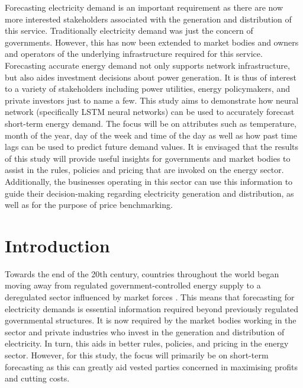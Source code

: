 \documentclass[mstat,12pt]{unswthesis}
\begin{document}
Forecasting electricity demand is an important requirement as there are
now more interested stakeholders associated with the generation and
distribution of this service. Traditionally electricity demand was just
the concern of governments. However, this has now been extended to
market bodies and owners and operators of the underlying infrastructure
required for this service. Forecasting accurate energy demand not only
supports network infrastructure, but also aides investment decisions
about power generation. It is thus of interest to a variety of
stakeholders including power utilities, energy policymakers, and private
investors just to name a few. This study aims to demonstrate how neural
network (specifically LSTM neural networks) can be used to accurately
forecast short-term energy demand. The focus will be on attributes such
as temperature, month of the year, day of the week and time of the day
as well as how past time lags can be used to predict future demand
values. It is envisaged that the results of this study will provide
useful insights for governments and market bodies to assist in the
rules, policies and pricing that are invoked on the energy sector.
Additionally, the businesses operating in this sector can use this
information to guide their decision-making regarding electricity
generation and distribution, as well as for the purpose of price
benchmarking.



\afterpreface





%
%






\hypertarget{introduction}{%
\chapter{Introduction}\label{introduction}}

Towards the end of the 20th century, countries throughout the world
began moving away from regulated government-controlled energy supply to
a deregulated sector influenced by market forces \cite{Catalao2007}.
This means that forecasting for electricity demands is essential
information required beyond previously regulated governmental
structures. It is now required by the market bodies working in the
sector and private industries who invest in the generation and
distribution of electricity. In turn, this aids in better rules,
policies, and pricing in the energy sector. However, for this study, the
focus will primarily be on short-term forecasting as this can greatly
aid vested parties concerned in maximising profits and cutting costs.
\end{document}
